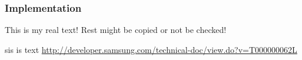 \subsubsection{Implementation} \label{subsection:license-samsung-implementation}
This is my real text! Rest might be copied or not be checked!


sis is text
\url{http://developer.samsung.com/technical-doc/view.do?v=T000000062L}
